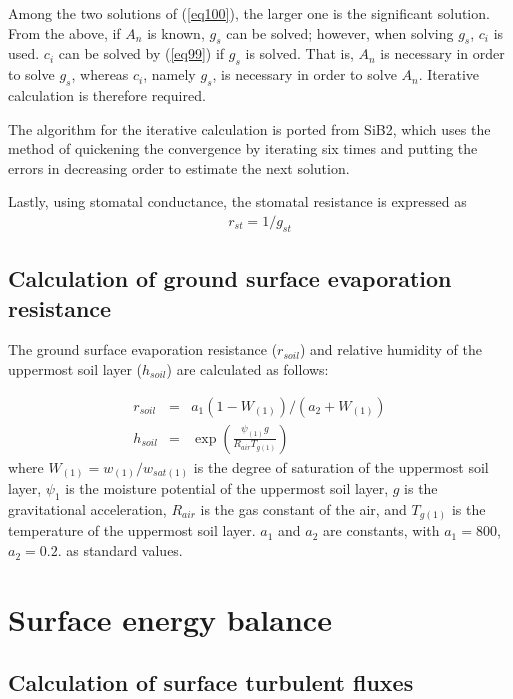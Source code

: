 Among the two solutions of (\ref{eq100}), the larger one is the significant solution. From the above, if \(A_n\) is known, \(g_s\) can be solved; however, when solving \(g_s\), \(c_i\)
is used. \(c_i\) can be solved by (\ref{eq99}) if \(g_s\) is solved. That is, \(A_n\) is necessary in order to solve \(g_s\), whereas \(c_i\), namely \(g_s\), is necessary in order to
solve \(A_n\). Iterative calculation is therefore required.

The algorithm for the iterative calculation is ported from SiB2, which uses the method of quickening the convergence by iterating six times and putting the errors in decreasing order to estimate the
next solution.

Lastly, using stomatal conductance, the stomatal resistance is expressed as \begin{eqnarray}
 r_{st} = 1/g_{st}
\end{eqnarray}

\hypertarget{calculation-of-ground-surface-evaporation-resistance}{%
\subsection{Calculation of ground surface evaporation resistance}\label{calculation-of-ground-surface-evaporation-resistance}}

The ground surface evaporation resistance (\(r_{soil}\)) and relative humidity of the uppermost soil layer (\(h_{soil}\)) are calculated as follows:

\begin{eqnarray}
 r_{soil} &=& a_1 ( 1 - W_{(1)} ) / ( a_2 + W_{(1)} ) \\
 h_{soil} &=& \exp \left(\frac{\psi_{(1)} g}{R_{air} T_{g(1)}} \right)
\end{eqnarray} where \(W_{(1)} = w_{(1)}/w_{sat(1)}\) is the degree of saturation of the uppermost soil layer, \(\psi_{1}\) is the moisture potential of the uppermost soil layer, \(g\) is the gravitational
acceleration, \(R_{air}\) is the gas constant of the air, and \(T_{g(1)}\) is the temperature of the uppermost soil layer. \(a_1\) and \(a_2\) are constants, with \(a_1=800\), \(a_2=0.2\). as standard
values.

\hypertarget{surface-energy-balance}{%
\section{Surface energy balance}\label{surface-energy-balance}}

\hypertarget{calculation-of-surface-turbulent-fluxes}{%
\subsection{Calculation of surface turbulent fluxes}\label{calculation-of-surface-turbulent-fluxes}}

